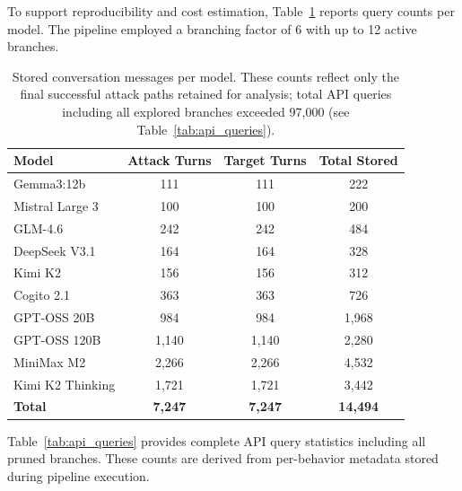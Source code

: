 \documentclass[11pt,a4paper]{article}
\begin{document}
To support reproducibility and cost estimation, Table~\ref{tab:queries} reports query counts per model. The pipeline employed a branching factor of 6 with up to 12 active branches.

\begin{table}[H]
\centering
\caption{Stored conversation messages per model. These counts reflect only the final successful attack paths retained for analysis; total API queries including all explored branches exceeded 97,000 (see Table~\ref{tab:api_queries}).}
\label{tab:queries}
\begin{tabular}{lccc}
\toprule
\textbf{Model} & \textbf{Attack Turns} & \textbf{Target Turns} & \textbf{Total Stored} \\
\midrule
Gemma3:12b & 111 & 111 & 222 \\
Mistral Large 3 & 100 & 100 & 200 \\
GLM-4.6 & 242 & 242 & 484 \\
DeepSeek V3.1 & 164 & 164 & 328 \\
Kimi K2 & 156 & 156 & 312 \\
Cogito 2.1 & 363 & 363 & 726 \\
GPT-OSS 20B & 984 & 984 & 1{,}968 \\
GPT-OSS 120B & 1{,}140 & 1{,}140 & 2{,}280 \\
MiniMax M2 & 2{,}266 & 2{,}266 & 4{,}532 \\
Kimi K2 Thinking & 1{,}721 & 1{,}721 & 3{,}442 \\
\midrule
\textbf{Total} & \textbf{7{,}247} & \textbf{7{,}247} & \textbf{14{,}494} \\
\bottomrule
\end{tabular}
\end{table}

Table~\ref{tab:api_queries} provides complete API query statistics including all pruned branches. These counts are derived from per-behavior metadata stored during pipeline execution.
\end{document}
